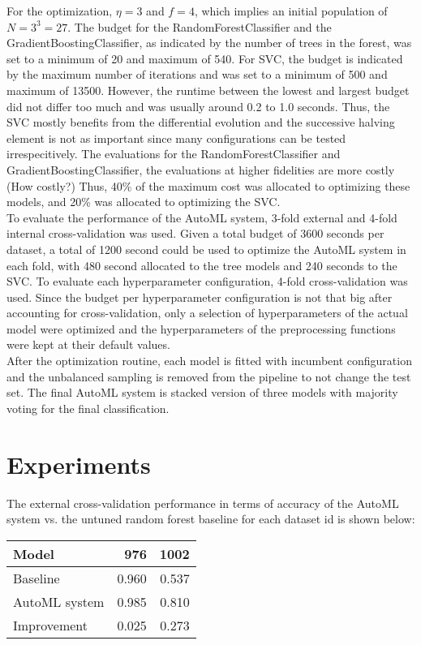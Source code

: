 \documentclass[11pt]{article}
\begin{document}
For the optimization, $\eta=3$ and $f=4$, which implies an initial population of $N=3^{3}=27$. The budget for the RandomForestClassifier and the GradientBoostingClassifier, as indicated by the number of trees in the forest, was set to a minimum of 20 and maximum of 540. For SVC, the budget is indicated by the maximum number of iterations and was set to a minimum of 500 and maximum of 13500. However, the runtime between the lowest and largest budget did not differ too much and was usually around 0.2 to 1.0 seconds. Thus, the SVC mostly benefits from the differential evolution and the successive halving element is not as important since many configurations can be tested irrespecitively. The evaluations for the RandomForestClassifier and GradientBoostingClassifier, the evaluations at higher fidelities are more costly (How costly?) Thus, 40\% of the maximum cost was allocated to optimizing these models, and 20\% was allocated to optimizing the SVC. \\

To evaluate the performance of the AutoML system, 3-fold external and 4-fold internal cross-validation was used. Given a total budget of 3600 seconds per dataset, a total of 1200 second could be used to optimize the AutoML system in each fold, with 480 second allocated to the tree models and 240 seconds to the SVC. To evaluate each hyperparameter configuration, 4-fold cross-validation was used. Since the budget per hyperparameter configuration is not that big after accounting for cross-validation, only a selection of hyperparameters of the actual model were optimized and the hyperparameters of the preprocessing functions were kept at their default values. \\

After the optimization routine, each model is fitted with incumbent configuration and the unbalanced sampling is removed from the pipeline to not change the test set. The final AutoML system is stacked version of three models with majority voting for the final classification.

\section{Experiments}

The external cross-validation performance in terms of accuracy of the AutoML system vs. the untuned random forest baseline for each dataset id is shown below:

\begin{table}[h]
\begin{tabular}{lrr}
\toprule
        Model &   976 &  1002 \\
\midrule
   Baseline & 0.960 & 0.537 \\
  AutoML system & 0.985 & 0.810 \\
\midrule
  Improvement & 0.025 & 0.273 \\
\bottomrule
\end{tabular}
\end{table}
\end{document}
